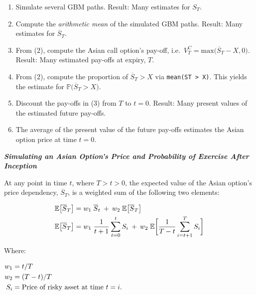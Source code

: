 \documentclass[
  12pt,
]{article}
\providecommand{\tightlist}{%
  \setlength{\itemsep}{0pt}\setlength{\parskip}{0pt}}
\begin{document}
\begin{enumerate}
\def\labelenumi{\arabic{enumi}.}
\tightlist
\item
  Simulate several GBM paths. Result: Many estimates for \(S_T\).
\item
  Compute the \emph{arithmetic mean} of the simulated GBM paths. Result:
  Many estimates for \(\overline{S}_T\).
\item
  From (2), compute the Asian call option's pay-off,
  i.e.~\(V^C_T = \text{max} \big(\overline{S}_T - X,0 \big)\). Result:
  Many estimated pay-offs at expiry, \(T\).
\item
  From (2), compute the proportion of \(\overline{S}_T > X\) via
  \texttt{mean(ST\ \textgreater{}\ X)}. This yields the estimate for
  \(\mathbb P\big(\overline{S}_T > X \big)\).
\item
  Discount the pay-offs in (3) from \(T\) to \(t=0\). Result: Many
  present values of the estimated future pay-offs.
\item
  The average of the present value of the future pay-offs estimates the
  Asian option price at time \(t=0\).
\end{enumerate}

\vspace{2mm}

\textbf{\emph{Simulating an Asian Option's Price and Probability of
Exercise After Inception}}

At any point in time \(t\), where \(T>t>0\), the expected value of the
Asian option's price dependency, \(\overline{S}_T\), is a weighted sum
of the following two elements:

\begin{align}
\mathbb E\big[\overline{S}_T\big] &= w_1 \; \overline{S}_t \: + \: w_2 \; \mathbb E\big[ \overline{S}_T \big] \notag\\
\vspace{2mm}
\mathbb E\big[\overline{S}_T\big] &= w_1 \; \frac{1}{t+1} \sum^{t}_{t=0} S_i \: + \: w_2 \; \mathbb E\bigg[ \frac{1}{T-t}\sum^{T}_{i=t+1} S_i\bigg]
\end{align}

\small

Where:

\(\begin{aligned} w_1 &= t/T \notag\\ \vspace{1mm} w_2 &= (T-t)/T \notag\\ \vspace{1mm} S_i &= \text{Price of risky asset at time } t=i. \notag \label{weighted_sum} \end{aligned}\)
\end{document}
